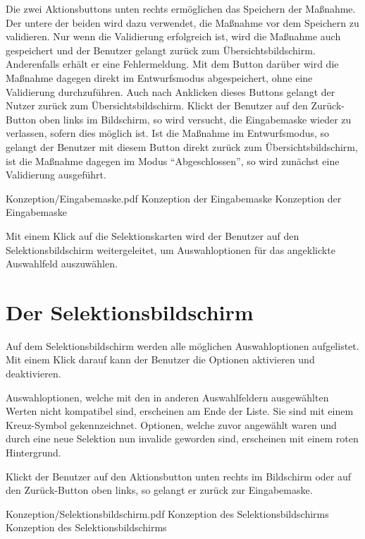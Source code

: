Die zwei Aktionsbuttons unten rechts ermöglichen das Speichern der Maßnahme.
Der untere der beiden wird dazu verwendet,
die Maßnahme vor dem Speichern zu validieren.
Nur wenn die Validierung erfolgreich ist,
wird die Maßnahme auch gespeichert und der Benutzer gelangt zurück zum Übersichtsbildschirm.
Anderenfalls erhält er eine Fehlermeldung.
Mit dem Button darüber wird die Maßnahme dagegen direkt im Entwurfsmodus abgespeichert,
ohne eine Validierung durchzuführen.
Auch nach Anklicken dieses Buttons gelangt der Nutzer zurück zum Übersichtsbildschirm.
Klickt der Benutzer auf den Zurück-Button oben links im Bildschirm,
so wird versucht,
die Eingabemaske wieder zu verlassen,
sofern dies möglich ist.
Ist die Maßnahme im Entwurfsmodus,
so gelangt der Benutzer mit diesem Button direkt zurück zum Übersichtsbildschirm,
ist die Maßnahme dagegen im Modus \enquote{Abgeschlossen},
so wird zunächst eine Validierung ausgeführt.

\begin{alexfigure}{Konzeption/Eingabemaske.pdf}
  {Konzeption der Eingabemaske}
  {Konzeption der Eingabemaske}

  \label{fig:KonzeptionEingabemaske}

\end{alexfigure}

Mit einem Klick auf die Selektionskarten wird der Benutzer auf den Selektionsbildschirm weitergeleitet, 
um Auswahloptionen für das angeklickte Auswahlfeld auszuwählen.

\section{Der Selektionsbildschirm}

Auf dem Selektionsbildschirm \Abb{\ref{fig:KonzeptionSelektionsbildschirm}} werden alle möglichen Auswahloptionen aufgelistet.
Mit einem Klick darauf kann der Benutzer die Optionen aktivieren und deaktivieren.

Auswahloptionen, welche mit den in anderen Auswahlfeldern ausgewählten Werten nicht kompatibel sind,
erscheinen am Ende der Liste. Sie sind mit einem Kreuz-Symbol gekennzeichnet.
Optionen, welche zuvor angewählt waren und durch eine neue Selektion nun invalide geworden sind,
erscheinen mit einem roten Hintergrund.


Klickt der Benutzer auf den Aktionsbutton unten rechts im Bildschirm oder auf den Zurück-Button oben links,
so gelangt er zurück zur Eingabemaske.

\begin{alexfigure}{Konzeption/Selektionsbildschirm.pdf}
  {Konzeption des Selektionsbildschirms}
  {Konzeption des Selektionsbildschirms}

  \label{fig:KonzeptionSelektionsbildschirm}

\end{alexfigure}